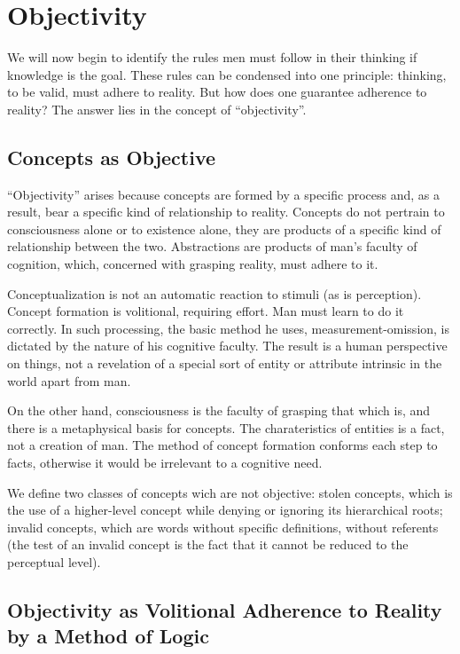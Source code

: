 \chapter{Objectivity}

    We will now begin to identify the rules men must follow in their thinking if knowledge is the goal. These rules can be condensed into one principle: thinking, to be valid, must adhere to reality. But how does one guarantee adherence to reality? The answer lies in the concept of ``objectivity''.

    \section{Concepts as Objective}

        ``Objectivity'' arises because concepts are formed by a specific process and, as a result, bear a specific kind of relationship to reality. Concepts do not pertrain to consciousness alone or to existence alone, they are products of a specific kind of relationship between the two. Abstractions are products of man's faculty of cognition, which, concerned with grasping reality, must adhere to it.

        Conceptualization is not an automatic reaction to stimuli (as is perception). Concept formation is volitional, requiring effort. Man must learn to do it correctly. In such processing, the basic method he uses, measurement-omission, is dictated by the nature of his cognitive faculty. The result is a human perspective on things, not a revelation of a special sort of entity or attribute intrinsic in the world apart from man.

        On the other hand, consciousness is the faculty of grasping that which is, and there is a metaphysical basis for concepts. The charateristics of entities is a fact, not a creation of man. The method of concept formation conforms each step to facts, otherwise it would be irrelevant to a cognitive need.

        We define two classes of concepts wich are not objective: stolen concepts, which is the use of a higher-level concept while denying or ignoring its hierarchical roots; invalid concepts, which are words without specific definitions, without referents (the test of an invalid concept is the fact that it cannot be reduced to the perceptual level).

    \section{Objectivity as Volitional Adherence to Reality by a Method of Logic}

